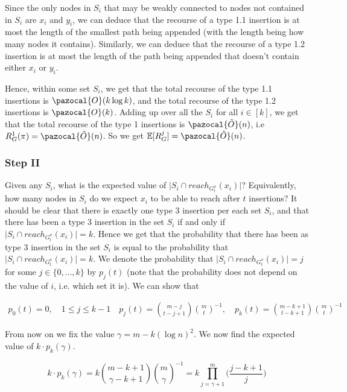 \documentclass{article}
\begin{document}
Since the only nodes in $S_{i}$ that may be weakly connected to nodes not contained in $S_{i}$ are $x_{i}$ and $y_{i}$, we can deduce that the recourse of a type 1.1 insertion is at most the length of the smallest path being appended (with the length being how many nodes it contains). Similarly, we can deduce that the recourse of a type 1.2 insertion is at most the length of the path being appended that doesn't contain either $x_{i}$ or $y_{i}$.

Hence, within some set $S_{i}$, we get that the total recourse of the type 1.1 insertions is $\pazocal{O}(k \log k)$, and the total recourse of the type 1.2 insertions is $\pazocal{O}(k)$. Adding up over all the $S_{i}$ for all $i \in [k]$, we get that the total recourse of the type 1 insertions is $\pazocal{\tilde{O}}(n)$, i.e $R_{G}^{1}(\pi)=\pazocal{\tilde{O}}(n)$. So we get $\mathbb{E}[R_{G}^{j}]=\pazocal{\tilde{O}}(n)$.

\subsubsection{Step II}

Given any $S_{i}$, what is the expected value of $\vert S_{i} \cap reach_{G_{t}^{\pi}}(x_{i})\vert$? Equivalently, how many nodes in $S_{i}$ do we expect $x_{i}$ to be able to reach after $t$ insertions? It should be clear that there is exactly one type 3 insertion per each set $S_{i}$, and that there has been a type 3 insertion in the set $S_{i}$ if and only if $\vert S_{i} \cap reach_{G_{t}^{\pi}}(x_{i})\vert = k$. Hence we get that the probability that there has been as type 3 insertion in the set $S_{i}$ is equal to the probability that $\vert S_{i} \cap reach_{G_{t}^{\pi}}(x_{i})\vert = k$. We denote the probability that $\vert S_{i} \cap reach_{G_{t}^{\pi}}(x_{i})\vert = j$ for some $j \in \{0,...,k\}$ by $p_{j}(t)$ (note that the probability does not depend on the value of $i$, i.e. which set it is). We can show that

\begin{align*}
p_{0}(t) = 0,     \quad 1 \leq j \leq k-1 \quad p_{j}(t) = \binom{m-j}{t-j+1}\binom{m}{t}^{-1}, \quad p_{k}(t) = \binom{m-k+1}{t-k+1}\binom{m}{t}^{-1}
\end{align*}

From now on we fix the value $\gamma=m-k(\log n)^2$. We now find the expected value of $k \cdot p_{k}(\gamma)$.

\[k \cdot p_{k}(\gamma) = k\binom{m-k+1}{\gamma-k+1}\binom{m}{\gamma}^{-1} = k\prod_{j=\gamma + 1}^{m} \bigg( \frac{j-k+1}{j} \bigg) \]
\end{document}
